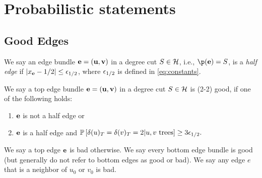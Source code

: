 \section{Probabilistic statements}
\label{sec:probabilistic}







\subsection{Good Edges}




\begin{definition}\label{def:halfedges}
We say an edge bundle ${\bf e}={\bf (u,v)}$ in a degree cut $S\in\mathcal{H}$, i.e., $\p(\bbe)=S$, is a {\em half edge} if $|x_{\bf e}-1/2|\leq {\epsilon}_{1/2}$, where ${\epsilon}_{1/2}$ is defined in \ref{eq:constants}.
\end{definition}

\begin{definition}\label{def:goodedges}
	We say a top edge bundle ${\bf e}={\bf(u,v)}$ in a degree cut $S\in\mathcal{H}$ is (2-2) good, if one of the following holds:
	\begin{enumerate}
		\item ${\bf e}$ is not a half edge or
		\item ${\bf e}$ is a half edge and ${\mathbb{P}}\left[\delta(u)_T=\delta(v)_T= 2 | u,v\text{ trees}\right] \geq 3{\epsilon}_{1/2}.$
	\end{enumerate}
	We say a top edge ${\bf e}$ is bad otherwise. 
	We say every bottom edge bundle is good (but generally do not refer to bottom edges as good or bad). We say any edge $e$ that is a neighbor of $u_0$ or $v_0$ is bad.
\end{definition}

